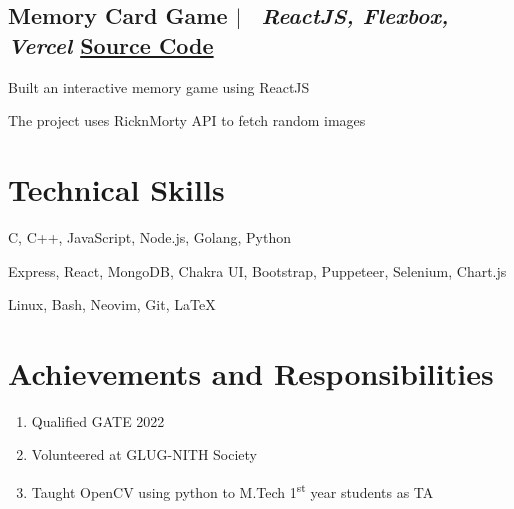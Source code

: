 \documentclass[10pt]{article}
\begin{document}
\subsection*{
  Memory Card Game 
  $|$ 
  \normalsize \normalfont \ \textit{ReactJS, Flexbox, Vercel }
  \hfill
  \normalsize \href{https://github.com/harsh-sheth/memory_card_game}{Source Code}
}
  \begin{description}
    \setlength{\itemsep}{0em}
    \setlength{\itemindent}{2\parindent}
    \item[$\bullet$]{Built an interactive memory game using ReactJS}
    \item[$\bullet$]{The project uses RicknMorty API to fetch random images}
  \end{description}




\section{Technical Skills}
\begin{description}
  \setlength{\itemindent}{\parindent}
  \setlength{\itemsep}{0em}
  \item[Languages:]{C, C++, JavaScript, Node.js, Golang, Python}
  \item[Web Technologies:]{Express, React, MongoDB, Chakra UI, Bootstrap, Puppeteer, Selenium, Chart.js}
  \item[Tools:]{Linux, Bash, Neovim, Git, \LaTeX}
\end{description}


\section{Achievements and Responsibilities}
\begin{enumerate}
  \setlength{\itemsep}{0em}
  \item Qualified GATE 2022
  \item Volunteered at GLUG-NITH Society
  \item Taught OpenCV using python to M.Tech 1\textsuperscript{st} year students as TA
\end{enumerate}
\end{document}

